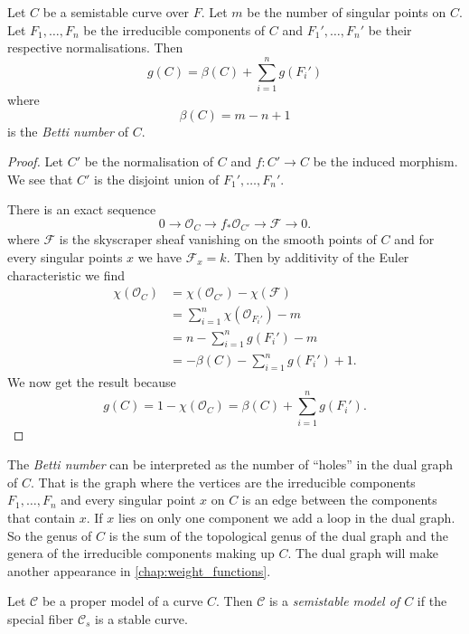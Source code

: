 \begin{lemma}\label{lem:genus_semi_stable_curve}
	Let $C$ be a semistable curve over $F$. 
	Let $m$ be the number of singular points on $C$. 
	Let $F_1, \ldots, F_n$ be the irreducible components of $C$ and $F_1', \ldots, F_n'$ be their respective normalisations.
	Then \[
		g(C) = \beta(C) + \sum_{i = 1}^{n} g(F_i')
	\] 
	where \[
		\beta(C) = m - n + 1
	\]
	is the \emph{Betti number} of $C$. 
\end{lemma}
\begin{proof}
	Let $C'$ be the normalisation of $C$ and $f: C' \to C$ be the induced morphism. 
	We see that  $C'$ is the disjoint union of $F_1', \ldots, F_n'$. 

	There is  an exact sequence \[
	0 \to \mathcal{O}_C \to f_* \mathcal{O}_{C'} \to \mathcal{F} \to 0 
	.\] 
	where $\mathcal{F} $ is the skyscraper sheaf vanishing on the smooth points of $C$ and for every singular points $x$ we have $\mathcal{F} _x = k$.  
	Then by additivity of the Euler characteristic we find
	\begin{align*}
		\chi(\mathcal O_C) &= \chi(\mathcal O_{C'}) - \chi(\mathcal F) \\
				   &= \sum_{i = 1}^{n} \chi(\mathcal O_{F_i'}) - m\\
				   &= n -  \sum_{i = 1}^{n} g(F_i') - m\\
				   &= -\beta(C) - \sum_{i = 1}^{n} g(F_i') + 1 
	.\end{align*}
	We now get the result because \[
		g(C) = 1 - \chi(\mathcal{O}_C) = \beta(C) + \sum_{i = 1}^{n} g(F_i')  
	.\] 
\end{proof}
\begin{remark}\label{rem:genus_semi_stable_curve}
	The \emph{Betti number} can be interpreted as the number of ``holes'' in the dual graph of $C$. 
	That is the graph where the vertices are the irreducible components $F_1, \ldots, F_n$ and every singular point $x$ on $C$ is an edge between the components that contain $x$.
	If $x$ lies on only one component we add a loop in the dual graph.
	So the genus of $C$ is the sum of the topological genus of the dual graph and the genera of the irreducible components making up $C$.
	The dual graph will make another appearance in \cref{chap:weight_functions}. 
\end{remark}

\begin{definition}\label{def:semi_stable_model}
	Let  $\mathscr C$ be a proper model of a curve $C$. 
	Then $\mathscr C$ is a \emph{semistable model of $C$} if the special fiber $\mathscr C_s$ is a stable curve. 
\end{definition}

